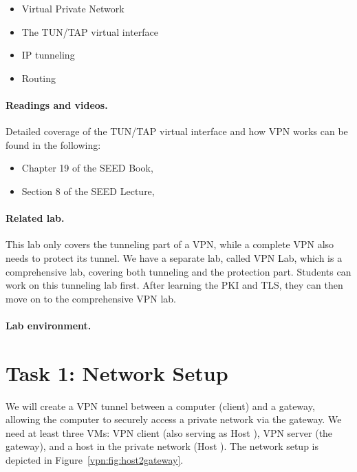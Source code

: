 \begin{itemize}[noitemsep]
\item Virtual Private Network
\item The TUN/TAP virtual interface 
\item IP tunneling 
\item Routing
\end{itemize}


\paragraph{Readings and videos.}
Detailed coverage of the TUN/TAP virtual interface and how 
VPN works can be found in the following:

\begin{itemize}
\item Chapter 19 of the SEED Book, \seedbook
\item Section 8 of the SEED Lecture, \seedisvideo
\end{itemize}


\paragraph{Related lab.}
This lab only covers the tunneling part of a VPN, while 
a complete VPN also needs to protect its tunnel. 
We have a separate lab, called VPN Lab, which
is a comprehensive lab, covering both tunneling and 
the protection part. Students can work on this tunneling
lab first. After learning the PKI and TLS, 
they can then move on to the comprehensive VPN lab.


\paragraph{Lab environment.} \seedenvironment




\newpage
\section{Task 1: Network Setup }


We will create a VPN tunnel between a 
computer (client) and a gateway, allowing the computer to securely access 
a private network via the gateway. 
We need at least three VMs: VPN client (also serving as Host \hostu), VPN server (the gateway),
and a host in the private network (Host \hostv). 
The network setup is depicted in Figure~\ref{vpn:fig:host2gateway}.


